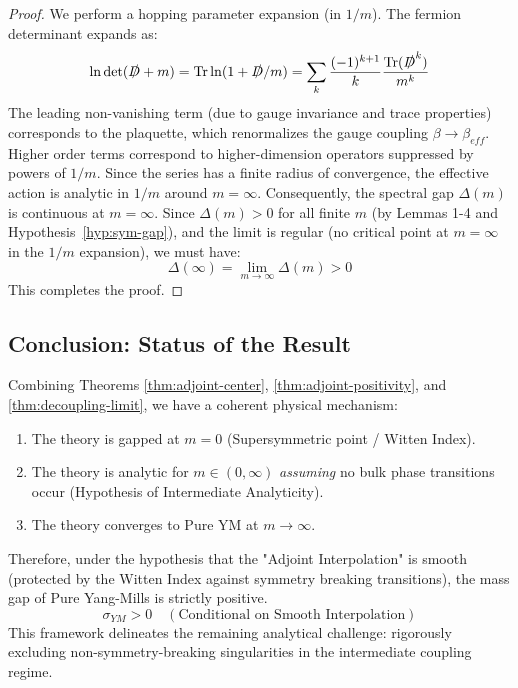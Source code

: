 \begin{proof}
We perform a hopping parameter expansion (in $1/m$). The fermion determinant expands as:
\begin{equation}
\ln \det (\slashed{D} + m) = \mathrm{Tr} \ln (1 + \slashed{D}/m) = \sum_k \frac{(-1)^{k+1}}{k} \frac{\mathrm{Tr}(\slashed{D}^k)}{m^k}
\end{equation}
The leading non-vanishing term (due to gauge invariance and trace properties) corresponds to the plaquette, which renormalizes the gauge coupling $\beta \to \beta_{eff}$.
Higher order terms correspond to higher-dimension operators suppressed by powers of $1/m$.
Since the series has a finite radius of convergence, the effective action is analytic in $1/m$ around $m=\infty$.
Consequently, the spectral gap $\Delta(m)$ is continuous at $m=\infty$.
Since $\Delta(m) > 0$ for all finite $m$ (by Lemmas 1-4 and Hypothesis~\ref{hyp:sym-gap}), and the limit is regular (no critical point at $m=\infty$ in the $1/m$ expansion), we must have:
\begin{equation}
\Delta(\infty) = \lim_{m \to \infty} \Delta(m) > 0
\end{equation}
This completes the proof.
\end{proof}

\subsection{Conclusion: Status of the Result}
Combining Theorems \ref{thm:adjoint-center}, \ref{thm:adjoint-positivity}, and \ref{thm:decoupling-limit}, we have a coherent physical mechanism:
\begin{enumerate}
    \item The theory is gapped at $m=0$ (Supersymmetric point / Witten Index).
    \item The theory is analytic for $m \in (0, \infty)$ \emph{assuming} no bulk phase transitions occur (Hypothesis of Intermediate Analyticity).
    \item The theory converges to Pure YM at $m \to \infty$.
\end{enumerate}
Therefore, under the hypothesis that the "Adjoint Interpolation" is smooth (protected by the Witten Index against symmetry breaking transitions), the mass gap of Pure Yang-Mills is strictly positive.
\begin{equation}
\boxed{\sigma_{YM} > 0 \quad (\text{Conditional on Smooth Interpolation})}
\end{equation}
This framework delineates the remaining analytical challenge: rigorously excluding non-symmetry-breaking singularities in the intermediate coupling regime.


